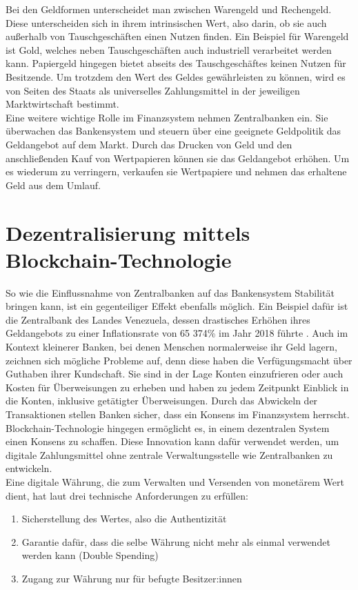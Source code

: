 Bei den Geldformen unterscheidet man zwischen Warengeld und Rechengeld. Diese unterscheiden sich in ihrem intrinsischen Wert, also darin, ob sie auch außerhalb von Tauschgeschäften einen Nutzen finden. Ein Beispiel für Warengeld ist Gold, welches neben Tauschgeschäften auch industriell verarbeitet werden kann.
Papiergeld hingegen bietet abseits des Tauschgeschäftes keinen Nutzen für Besitzende. Um trotzdem den Wert des Geldes gewährleisten zu können, wird es von Seiten des Staats als universelles Zahlungsmittel in der jeweiligen Marktwirtschaft bestimmt.\\

Eine weitere wichtige Rolle im Finanzsystem nehmen Zentralbanken ein. Sie überwachen das Bankensystem und steuern über eine geeignete Geldpolitik das Geldangebot auf dem Markt.
Durch das Drucken von Geld und den anschließenden Kauf von Wertpapieren können sie das Geldangebot erhöhen. Um es wiederum zu verringern, verkaufen sie Wertpapiere und nehmen das erhaltene Geld aus dem Umlauf.\\

\section{Dezentralisierung mittels Blockchain-Technologie}
So wie die Einflussnahme von Zentralbanken auf das Bankensystem Stabilität bringen kann, ist ein gegenteiliger Effekt ebenfalls möglich. Ein Beispiel dafür ist die Zentralbank des Landes Venezuela, dessen drastisches Erhöhen ihres Geldangebots zu einer Inflationsrate von 65 374\% im Jahr 2018 führte \cite[]{statista_inflation_2021}. Auch im Kontext kleinerer Banken, bei denen Menschen normalerweise ihr Geld lagern, zeichnen sich mögliche Probleme auf, denn diese haben die Verfügungsmacht über Guthaben ihrer Kundschaft. Sie sind in der Lage Konten einzufrieren oder auch Kosten für Überweisungen zu erheben und haben zu jedem Zeitpunkt Einblick in die Konten, inklusive getätigter Überweisungen. Durch das Abwickeln der Transaktionen stellen Banken sicher, dass ein Konsens im Finanzsystem herrscht.\\

Blockchain-Technologie hingegen ermöglicht es, in einem dezentralen System einen Konsens zu schaffen. Diese Innovation kann dafür verwendet werden, um digitale Zahlungsmittel ohne zentrale Verwaltungsstelle wie Zentralbanken zu entwickeln.\\

Eine digitale Währung, die zum Verwalten und Versenden von monetärem Wert dient, hat laut \cite{antanopoulos_2014} drei technische Anforderungen zu erfüllen:
\begin{enumerate}
	\item Sicherstellung des Wertes, also die Authentizität
	\item Garantie dafür, dass die selbe Währung nicht mehr als einmal verwendet werden kann (Double Spending)
	\item Zugang zur Währung nur für befugte Besitzer:innen
\end{enumerate}


